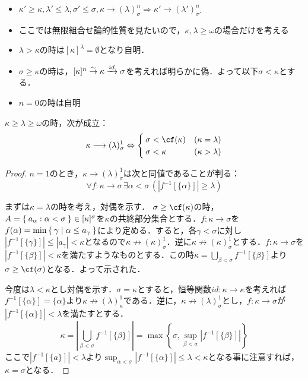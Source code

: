 \documentclass[a4paper]{bxjsarticle}
\begin{document}
\begin{rem*}
 \begin{itemize}
  \item $\kappa' \geq \kappa, \lambda' \leq \lambda, \sigma' \leq \sigma, \kappa \longrightarrow (\lambda)^n_\sigma
	\Longrightarrow \kappa' \longrightarrow (\lambda')^n_{\sigma'}$
  \item ここでは無限組合せ論的性質を見たいので，$\kappa, \lambda \geq \omega$の場合だけを考える
  \item $\lambda > \kappa$の時は$[\kappa]^\lambda = \emptyset$となり自明．
  \item $\sigma \geq \kappa$の時は，$[\kappa]^n \stackrel{\sim}{\to} \kappa \xrightarrow[]{id} \sigma$を考えれば明らかに偽．よって以下$\sigma < \kappa$とする．
  \item $n = 0$の時は自明
 \end{itemize}
\end{rem*}

\begin{lemma}\label{er:small}
 $\kappa \geq \lambda \geq \omega$の時，次が成立：
 \[
  \kappa \longrightarrow (\lambda)^1_\sigma
 \Leftrightarrow \begin{cases}
		  \sigma < \cf(\kappa) & (\kappa = \lambda)\\
		  \sigma < \kappa      & (\kappa > \lambda)
		 \end{cases}
 \]
\end{lemma}
\begin{proof}
 $n = 1$のとき，$\kappa \longrightarrow (\lambda)^1_\sigma$は次と同値であることが判る：
 \[
  \forall f : \kappa \rightarrow \sigma \, \exists \alpha < \sigma \, (|f^{-1}[\{\alpha\}]| \geq \lambda)
 \]
 
 まずは$\kappa = \lambda$の時を考え，対偶を示す．
 $\sigma \geq \cf(\kappa)$の時，$A = \Set{a_\alpha : \alpha < \sigma} \in [\kappa]^\sigma$を$\kappa$の共終部分集合とする．$f : \kappa \rightarrow \sigma$を$f(\alpha) = \min \Set{\gamma | \alpha \leq a_\gamma}$により定める．すると，各$\gamma < \sigma$に対し$|f^{-1}[\{\gamma\}]| \leq |a_\gamma| < \kappa$となるので$\kappa \nrightarrow (\kappa)^1_\sigma$．逆に$\kappa \nrightarrow (\kappa)^1_\sigma$とする．$f: \kappa \rightarrow \sigma$を$|f^{-1}[\{\beta\}]| < \kappa$を満たすようなものとする．この時$\kappa = \bigcup_{\beta < \sigma} f^{-1}[\{\beta\}]$より$\sigma \geq \cf(\sigma)$となる．よって示された．

 今度は$\lambda < \kappa$とし対偶を示す．$\sigma = \kappa$とすると，恒等関数$id: \kappa \rightarrow \kappa$を考えれば$f^{-1}[\{\alpha\}] = \{\alpha\}$より$\kappa \nrightarrow (\lambda)^1_\kappa$である．逆に，$\kappa \nrightarrow (\lambda)^1_\sigma$とし，$f : \kappa \rightarrow \sigma$が$|f^{-1}[\{\alpha\}]| < \lambda$を満たすとする．
 \[
  \kappa = \left|\bigcup_{\beta < \sigma} f^{-1}[\{\beta\}]\right| = \max\left\{ \sigma, \sup_{\beta < \sigma} \left|f^{-1}[\{\beta\}]\right| \right\}
 \]
 ここで$|f^{-1}[\{a\}]| < \lambda$より$\sup_{\alpha < \sigma} |f^{-1}[\{\alpha\}]| \leq \lambda < \kappa$となる事に注意すれば，$\kappa = \sigma$となる．\mbox{}
\end{proof}
\end{document}
